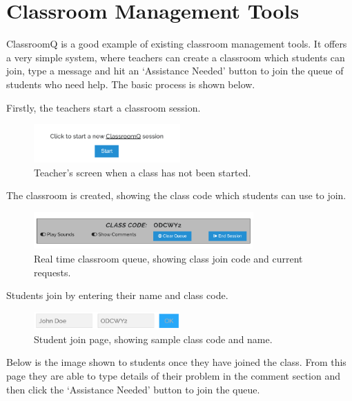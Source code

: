 \newpage
\section{Classroom Management Tools}

ClassroomQ is a good example of existing classroom management tools. It offers a very simple system, where teachers can create a classroom which students can join, type a message and hit an `Assistance Needed' button to join the queue of students who need help. The basic process is shown below.

Firstly, the teachers start a classroom session.

\FloatBarrier
\begin{figure}[H]
  \centering
  \includegraphics[width=0.5\textwidth]{2context/images/cq1.png}
  \caption{Teacher's screen when a class has not been started.}
\end{figure}

The classroom is created, showing the class code which students can use to join.

\FloatBarrier
\begin{figure}[H]
  \centering
  \includegraphics[width=0.75\textwidth]{2context/images/cq2.png}
  \caption{Real time classroom queue, showing class join code and current requests.}
\end{figure}

Students join by entering their name and class code.

\FloatBarrier
\begin{figure}[H]
  \centering
  \includegraphics[width=0.5\textwidth]{2context/images/cq3.png}
  \caption{Student join page, showing sample class code and name.}
\end{figure}

Below is the image shown to students once they have joined the class. From this page they are able to type details of their problem in the comment section and then click the `Assistance Needed' button to join the queue.

